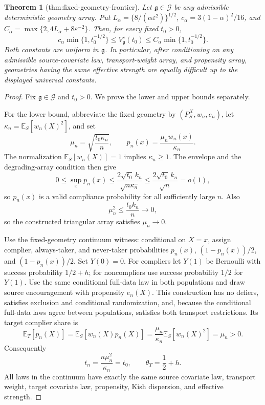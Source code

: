 \documentclass{article}
\newtheorem{theorem}{Theorem}
\begin{document}
\begin{theorem}[thm:fixed-geometry-frontier]\label{thm:fixed-geometry-frontier}
Let \(\mathfrak g\in\mathcal G\) be any admissible deterministic geometry array.  Put \(L_\alpha=\{8/(\alpha\varepsilon^2)\}^{1/2}\), \(c_\alpha=3(1-\alpha)^2/16\), and \(C_\alpha=\max\{2,4L_\alpha+8\varepsilon^{-2}\}\).  Then, for every fixed \(t_0>0\),
\[
 c_\alpha\min\{1,t_0^{-1/2}\}
 \le V_{\mathfrak g}^\star(t_0)
 \le C_\alpha\min\{1,t_0^{-1/2}\}.
\]
Both constants are uniform in \(\mathfrak g\).  In particular, after conditioning on any admissible source-covariate law, transport-weight array, and propensity array, geometries having the same effective strength are equally difficult up to the displayed universal constants.
\end{theorem}
\begin{proof}
Fix \(\mathfrak g\in\mathcal G\) and \(t_0>0\). We prove the lower and upper bounds separately.

For the lower bound, abbreviate the fixed geometry by \((P_S^X,w_n,e_n)\), let \(\kappa_n=\mathbb E_S[w_n(X)^2]\), and set
\[
 \mu_n=\sqrt{\frac{t_0\kappa_n}{n}},
 \qquad
 p_n(x)=\frac{\mu_nw_n(x)}{\kappa_n}.
\]
The normalization \(\mathbb E_S[w_n(X)]=1\) implies \(\kappa_n\ge1\). The envelope and the degrading-array condition then give
\[
 0\le\sup_xp_n(x)
 \le\frac{2\sqrt{t_0}\,k_n}{\sqrt{n\kappa_n}}
 \le\frac{2\sqrt{t_0}\,k_n}{\sqrt n}=o(1),
\]
so \(p_n(x)\) is a valid compliance probability for all sufficiently large \(n\). Also
\[
 \mu_n^2\le\frac{t_0k_n}{n}\longrightarrow0,
\]
so the constructed triangular array satisfies \(\mu_n\to0\).

Use the fixed-geometry continuum witness: conditional on \(X=x\), assign complier, always-taker, and never-taker probabilities \(p_n(x)\), \((1-p_n(x))/2\), and \((1-p_n(x))/2\). Set \(Y(0)=0\). For compliers let \(Y(1)\) be Bernoulli with success probability \(1/2+h\); for noncompliers use success probability \(1/2\) for \(Y(1)\). Use the same conditional full-data law in both populations and draw source encouragement with propensity \(e_n(X)\). This construction has no defiers, satisfies exclusion and conditional randomization, and, because the conditional full-data laws agree between populations, satisfies both transport restrictions. Its target complier share is
\[
 \mathbb E_T[p_n(X)]
 =\mathbb E_S[w_n(X)p_n(X)]
 =\frac{\mu_n}{\kappa_n}\mathbb E_S[w_n(X)^2]
 =\mu_n>0.
\]
Consequently
\[
 t_n=\frac{n\mu_n^2}{\kappa_n}=t_0,
 \qquad
 \theta_T=\frac12+h.
\]
All laws in the continuum have exactly the same source covariate law, transport weight, target covariate law, propensity, Kish dispersion, and effective strength.


\end{proof}
\end{document}
